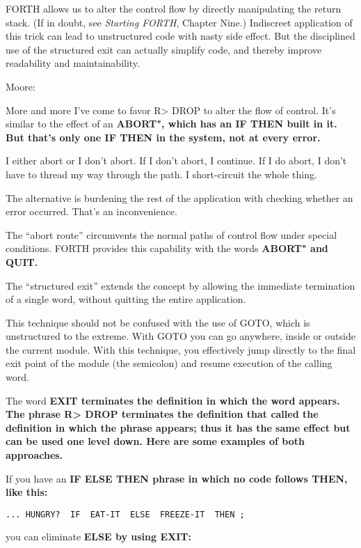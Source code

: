 FORTH allows us to alter the control flow by directly manipulating the
return stack. (If in doubt, see \emph{Starting FORTH}, Chapter Nine.)
Indiscreet application of this trick can lead to unstructured code with nasty
side effect. But the disciplined use of the structured exit can actually
simplify code, and thereby improve readability and maintainability.

Moore:

More and more I've come to favor R> DROP to alter the flow of control.
It's similar to the effect of an \bf{ABORT"}, which has an \bf{IF THEN}
built in it. But that's only one \bf{IF THEN} in the system, not at every
error.

I either abort or I don't abort. If I don't abort, I continue. If I do abort, I
don't have to thread my way through the path. I short-circuit the whole
thing.

The alternative is burdening the rest of the application with checking
whether an error occurred. That's an inconvenience.

The ``abort route'' circumvents the normal paths of control flow under
special conditions. FORTH provides this capability with the words
\bf{ABORT"} and \bf{QUIT}.

The ``structured exit'' extends the concept by allowing the immediate
termination of a single word, without quitting the entire application.

This technique should not be confused with the use of GOTO, which
is unstructured to the extreme. With GOTO you can go anywhere, inside
or outside the current module. With this technique, you effectively jump
directly to the final exit point of the module (the semicolon) and resume
execution of the calling word.

The word \bf{EXIT} terminates the definition in which the word appears.
The phrase \bf{R> DROP} terminates the definition that called the
definition in which the phrase appears; thus it has the same effect but can
be used one level down. Here are some examples of both approaches.

If you have an \bf{IF ELSE THEN} phrase in which no code follows
\bf{THEN}, like this:

\begin{verbatim}
... HUNGRY?  IF  EAT-IT  ELSE  FREEZE-IT  THEN ;
\end{verbatim}

you can eliminate \bf{ELSE} by using \bf{EXIT}:

